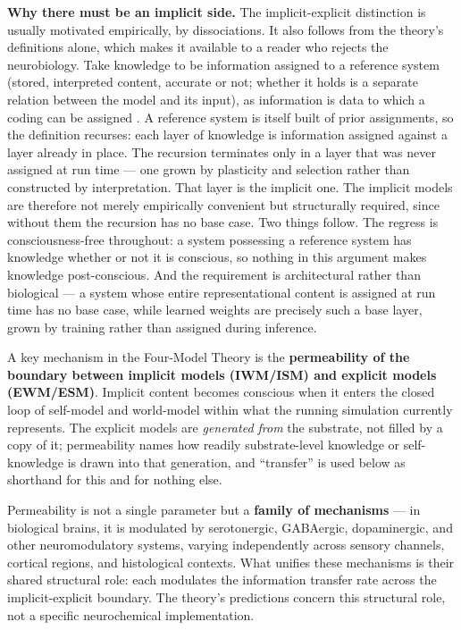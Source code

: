 \documentclass[12pt]{article}
\begin{document}
\textbf{Why there must be an implicit side.} The implicit-explicit distinction is usually motivated empirically, by dissociations. It also follows from the theory's definitions alone, which makes it available to a reader who rejects the neurobiology. Take knowledge to be information assigned to a reference system (stored, interpreted content, accurate or not; whether it holds is a separate relation between the model and its input), as information is data to which a coding can be assigned \citep{Gruber2015}. A reference system is itself built of prior assignments, so the definition recurses: each layer of knowledge is information assigned against a layer already in place. The recursion terminates only in a layer that was never assigned at run time --- one grown by plasticity and selection rather than constructed by interpretation. That layer is the implicit one. The implicit models are therefore not merely empirically convenient but structurally required, since without them the recursion has no base case. Two things follow. The regress is consciousness-free throughout: a system possessing a reference system has knowledge whether or not it is conscious, so nothing in this argument makes knowledge post-conscious. And the requirement is architectural rather than biological --- a system whose entire representational content is assigned at run time has no base case, while learned weights are precisely such a base layer, grown by training rather than assigned during inference.

A key mechanism in the Four-Model Theory is the \textbf{permeability of the boundary between implicit models (IWM/ISM) and explicit models (EWM/ESM)}. Implicit content becomes conscious when it enters the closed loop of self-model and world-model within what the running simulation currently represents. The explicit models are \emph{generated from} the substrate, not filled by a copy of it; permeability names how readily substrate-level knowledge or self-knowledge is drawn into that generation, and ``transfer'' is used below as shorthand for this and for nothing else.

Permeability is not a single parameter but a \textbf{family of mechanisms} --- in biological brains, it is modulated by serotonergic, GABAergic, dopaminergic, and other neuromodulatory systems, varying independently across sensory channels, cortical regions, and histological contexts. What unifies these mechanisms is their shared structural role: each modulates the information transfer rate across the implicit-explicit boundary. The theory's predictions concern this structural role, not a specific neurochemical implementation.
\end{document}
